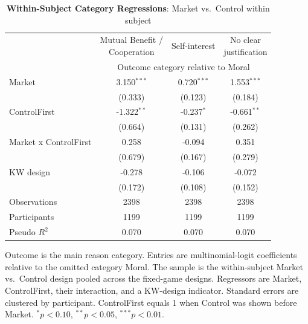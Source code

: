\begin{table}[!htbp]
\centering
\caption{\textbf{Within-Subject Category Regressions}: Market vs.\ Control within subject}
\label{tab:within_market_category_regressions}
\begin{tabular}{lccc}
\toprule
 & \shortstack{Mutual Benefit /\\ Cooperation} & Self-interest & \shortstack{No clear\\ justification} \\
 & \multicolumn{3}{c}{Outcome category relative to Moral} \\
\cmidrule(lr){2-4}
\midrule
Market & 3.150$^{***}$ & 0.720$^{***}$ & 1.553$^{***}$ \\
 & (0.333) & (0.123) & (0.184) \\
ControlFirst & -1.322$^{**}$ & -0.237$^{*}$ & -0.661$^{**}$ \\
 & (0.664) & (0.131) & (0.262) \\
Market x ControlFirst & 0.258 & -0.094 & 0.351 \\
 & (0.679) & (0.167) & (0.279) \\
KW design & -0.278 & -0.106 & -0.072 \\
 & (0.172) & (0.108) & (0.152) \\
Observations & 2398 & 2398 & 2398 \\
Participants & 1199 & 1199 & 1199 \\
Pseudo $R^2$ & 0.070 & 0.070 & 0.070 \\
\bottomrule
\end{tabular}
\begin{flushleft}
\footnotesize Outcome is the main reason category. Entries are multinomial-logit coefficients relative to the omitted category Moral. The sample is the within-subject Market vs.\ Control design pooled across the fixed-game designs. Regressors are Market, ControlFirst, their interaction, and a KW-design indicator. Standard errors are clustered by participant. ControlFirst equals 1 when Control was shown before Market. $^{*}p<0.10$, $^{**}p<0.05$, $^{***}p<0.01$.
\end{flushleft}
\end{table}